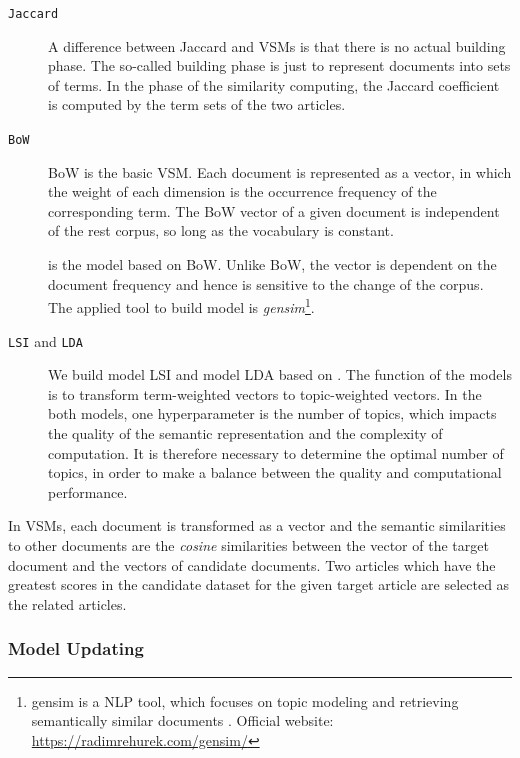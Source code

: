 \begin{description}
\item[\texttt{Jaccard}] A difference between Jaccard and VSMs is that there is no actual building phase. The so-called building phase is just to represent documents into sets of terms. In the phase of the similarity computing, the Jaccard coefficient is computed by the term sets of the two articles.
\item[\texttt{BoW}] BoW is the basic VSM. Each document is represented as a vector, in which the weight of each dimension is the occurrence frequency of the corresponding term. The BoW vector of a given document is independent of the rest corpus, so long as the vocabulary is constant.
\item[\texttt{\tfidf{}}] \tfidf{} is the model based on BoW. Unlike BoW, the \tfidf{} vector is dependent on the document frequency and hence is sensitive to the change of the corpus. The applied tool to build \tfidf{} model is \textit{gensim}\footnote{gensim is a NLP tool, which focuses on topic modeling and retrieving semantically similar documents \citep{rehurek_lrec}. Official website: \url{https://radimrehurek.com/gensim/}}.
\item[\texttt{LSI} and \texttt{LDA}] We build model LSI and model LDA based on \tfidf{}. The function of the models is to transform term-weighted vectors to topic-weighted vectors. In the both models, one hyperparameter is the number of topics, which impacts the quality of the semantic representation and the complexity of computation. It is therefore necessary to determine the optimal number of topics, in order to make a balance between the quality and computational performance. 
\end{description}

In VSMs, each document is transformed as a vector and the semantic similarities to other documents are the \textit{cosine} similarities between the vector of the target document and the vectors of candidate documents. Two articles which have the greatest scores in the candidate dataset for the given target article are selected as the related articles. 
\subsubsection{Model Updating}

